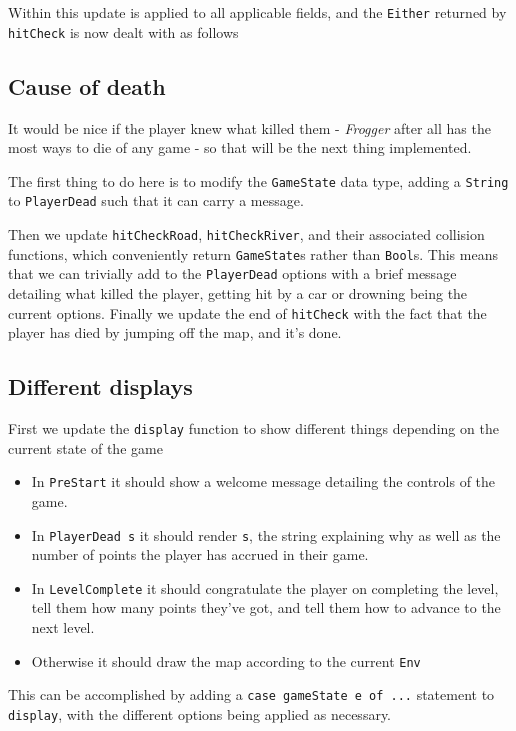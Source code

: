\documentclass[12pt, a4paper]{report}
\begin{document}
Within this update is applied to all applicable fields, and the \verb|Either| returned by \verb|hitCheck| is now dealt with as follows

\subsection{Cause of death}

It would be nice if the player knew what killed them - \textit{Frogger} after all has the most ways to die of any game - so that will be the next thing implemented.

The first thing to do here is to modify the \verb|GameState| data type, adding a \verb|String| to \verb|PlayerDead| such that it can carry a message.

Then we update \verb|hitCheckRoad|, \verb|hitCheckRiver|, and their associated collision functions, which conveniently return \verb|GameState|s rather than \verb|Bool|s.
This means that we can trivially add to the \verb|PlayerDead| options with a brief message detailing what killed the player, getting hit by a car or drowning being the current options.
Finally we update the end of \verb|hitCheck| with the fact that the player has died by jumping off the map, and it's done.

\subsection{Different displays}

First we update the \verb|display| function to show different things depending on the current state of the game
\begin{itemize}
  \item In \verb|PreStart| it should show a welcome message detailing the controls of the game.
  \item In \verb|PlayerDead s| it should render \verb|s|, the string explaining why as well as the number of points the player has accrued in their game.
  \item In \verb|LevelComplete| it should congratulate the player on completing the level, tell them how many points they've got, and tell them how to advance to the next level.
  \item Otherwise it should draw the map according to the current \verb|Env|
\end{itemize}

This can be accomplished by adding a \verb|case gameState e of ...| statement to \verb|display|, with the different options being applied as necessary.
\end{document}
